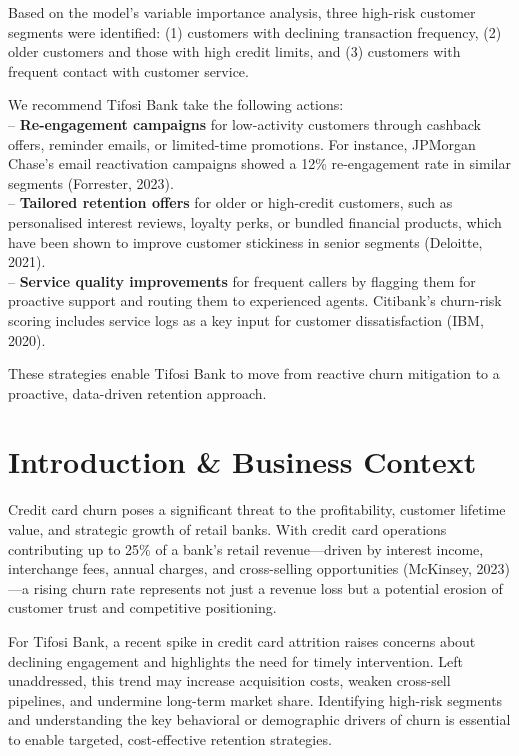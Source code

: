 \documentclass[
  letterpaper,
  DIV=11,
  numbers=noendperiod]{scrartcl}
\begin{document}
Based on the model's variable importance analysis, three high-risk
customer segments were identified: (1) customers with declining
transaction frequency, (2) older customers and those with high credit
limits, and (3) customers with frequent contact with customer service.

We recommend Tifosi Bank take the following actions:\\
-- \textbf{Re-engagement campaigns} for low-activity customers through
cashback offers, reminder emails, or limited-time promotions. For
instance, JPMorgan Chase's email reactivation campaigns showed a 12\%
re-engagement rate in similar segments (Forrester, 2023).\\
-- \textbf{Tailored retention offers} for older or high-credit
customers, such as personalised interest reviews, loyalty perks, or
bundled financial products, which have been shown to improve customer
stickiness in senior segments (Deloitte, 2021).\\
-- \textbf{Service quality improvements} for frequent callers by
flagging them for proactive support and routing them to experienced
agents. Citibank's churn-risk scoring includes service logs as a key
input for customer dissatisfaction (IBM, 2020).

These strategies enable Tifosi Bank to move from reactive churn
mitigation to a proactive, data-driven retention approach.

\section{Introduction \& Business
Context}\label{introduction-business-context}

Credit card churn poses a significant threat to the profitability,
customer lifetime value, and strategic growth of retail banks. With
credit card operations contributing up to 25\% of a bank's retail
revenue---driven by interest income, interchange fees, annual charges,
and cross-selling opportunities (McKinsey, 2023)---a rising churn rate
represents not just a revenue loss but a potential erosion of customer
trust and competitive positioning.

For Tifosi Bank, a recent spike in credit card attrition raises concerns
about declining engagement and highlights the need for timely
intervention. Left unaddressed, this trend may increase acquisition
costs, weaken cross-sell pipelines, and undermine long-term market
share. Identifying high-risk segments and understanding the key
behavioral or demographic drivers of churn is essential to enable
targeted, cost-effective retention strategies.
\end{document}
